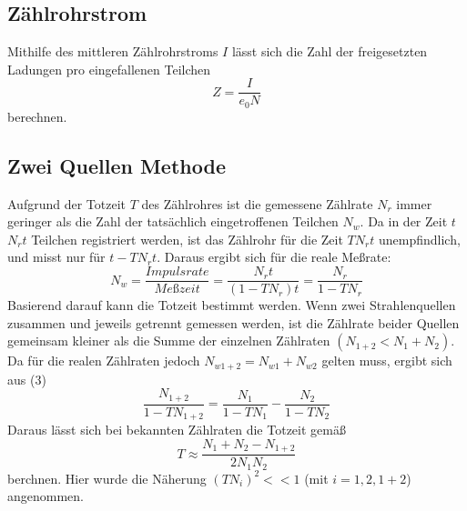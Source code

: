 \subsection{Zählrohrstrom}
Mithilfe des mittleren Zählrohrstroms $I$ lässt sich die Zahl der freigesetzten Ladungen pro eingefallenen Teilchen 
\begin{equation}
Z=\frac{I}{e_0N}
\end{equation}
berechnen. 
\subsection{Zwei Quellen Methode}
Aufgrund der Totzeit $T$ des Zählrohres ist die gemessene Zählrate $N_r$ immer geringer als die Zahl der tatsächlich eingetroffenen Teilchen $N_w$. Da in der Zeit $t$ $N_rt$ Teilchen registriert werden, ist das Zählrohr für die Zeit $TN_rt$ unempfindlich, und misst nur für $t-TN_rt$. Daraus ergibt sich für die reale Meßrate:
\begin{equation}
N_w=\frac{Impulsrate}{Meßzeit}=\frac{N_rt}{(1-TN_r)t}=\frac{N_r}{1-TN_r}
\end{equation}
Basierend darauf kann die Totzeit bestimmt werden. Wenn zwei Strahlenquellen zusammen und jeweils getrennt gemessen werden, ist die Zählrate beider Quellen gemeinsam kleiner als die Summe der einzelnen Zählraten $(N_{1+2}<N_1+N_2)$. Da für die realen Zählraten jedoch $N_{w1+2}=N_{w1}+N_{w2}$ gelten muss, ergibt sich aus (3)
\begin{equation}
\frac{N_{1+2}}{1-TN_{1+2}}=\frac{N_1}{1-TN_1}-\frac{N_2}{1-TN_2}
\end{equation}
Daraus lässt sich bei bekannten Zählraten die Totzeit gemäß
\begin{equation}
T\approx\frac{N_1+N_2-N_{1+2}}{2N_1N_2}
\end{equation}
berchnen. Hier wurde die Näherung $(TN_i)^2<<1$ (mit $i=1,2,1+2$) angenommen. 